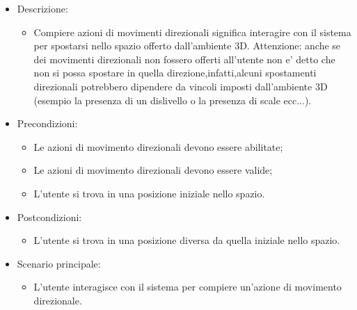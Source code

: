 \begin{itemize}

	\item Descrizione:
	\begin{itemize}
		\item Compiere azioni di movimenti direzionali significa interagire con il sistema per spostarsi nello spazio offerto dall'ambiente 3D.
\newline Attenzione: anche se dei movimenti direzionali non fossero offerti all'utente non e' detto che non si possa spostare in quella direzione,infatti,alcuni spostamenti direzionali potrebbero dipendere da vincoli imposti dall'ambiente 3D (esempio la presenza di un dislivello o la presenza di scale ecc...).
	\end{itemize}
	
	\item Precondizioni:
	\begin{itemize}
		\item Le azioni di movimento direzionali devono essere abilitate;
		\item Le azioni di movimento direzionali devono essere valide;
		\item L'utente si trova in una posizione iniziale nello spazio.
	\end{itemize}
	
	\item Postcondizioni:
	\begin{itemize}
		\item L'utente si trova in una posizione diversa da quella iniziale nello spazio.
	\end{itemize}
	
	\item Scenario principale:
	\begin{itemize}
		\item L'utente interagisce con il sistema per compiere un'azione di movimento direzionale.
	\end{itemize}
	
\end{itemize}

